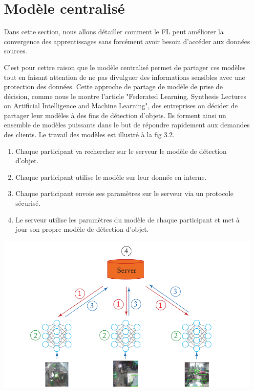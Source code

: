 \documentclass[12pt,a4paper]{report}
\begin{document}
\section{Modèle centralisé}

Dans cette section, nous allons détailler comment le FL peut améliorer la convergence des apprentissages sans forcément avoir besoin d'accéder aux données sources.

C'est pour cettre raison que le modèle centralisé permet de  partager ces modèles tout en faisant attention de ne pas divulguer des informations sensibles avec une protection des données. Cette approche de partage de modèle de prise de décision, comme nous le montre l'article "Federated Learning, Synthesis Lectures on Artificial Intelligence and Machine Learning", des entreprises on décider de partager leur modèles à des fins de détection d'objets. Ils forment ainsi un ensemble de modèles puissants dans le but de répondre rapidement aux demandes des clients. Le travail des modèles est illustré à la fig 3.2.

\begin{enumerate}
\item Chaque participant va rechercher sur le serveur le modèle de détection d'objet.
\item Chaque participant utilise le modèle sur leur donnée en interne.
\item Chaque participant envoie ses paramètres sur le serveur via un protocole sécurisé.
\item Le serveur utilise les paramètres du modèle de chaque participant et met à jour son propre modèle de détection d'objet.
\end{enumerate}

\begin{center}
    \includegraphics[scale=0.4]{fl_model_partage}
    \label{fig1}
\end{center}
\end{document}
